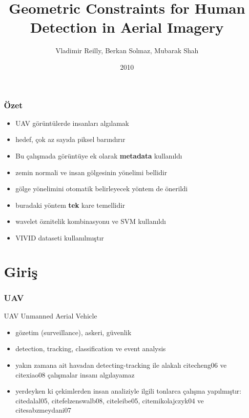 \documentclass{beamer}
\title{Geometric Constraints for Human Detection in Aerial Imagery}
\author{Vladimir Reilly, Berkan Solmaz, Mubarak Shah}
\date{2010}
\institute[CVL]{Computer Vision Lab, University of Central Florida, Orlando,
USA}
\begin{document}
\frame{\titlepage}

\section[İskelet]{}
\frame{\tableofcontents}

\begin{frame}
	\frametitle{Özet}

	\begin{itemize}
		\item UAV görüntülerde insanları algılamak
		\item hedef, çok az sayıda piksel barındırır
		\item Bu çalışmada görüntüye ek olarak \textbf{metadata} kullanıldı
		\item zemin normali ve insan gölgesinin yönelimi bellidir
		\item gölge yönelimini otomatik belirleyecek yöntem de önerildi
		\item buradaki yöntem \textbf{tek} kare temellidir
		\item wavelet öznitelik kombinasyonu ve SVM kullanıldı
		\item VIVID dataseti kullanılmıştır
	\end{itemize}
\end{frame}

\section{Giriş}

\begin{frame}
	\frametitle{UAV}

	\begin{block}{UAV}
		Unmanned Aerial Vehicle
	\end{block}

	\begin{itemize}
		\item gözetim (surveillance), askeri, güvenlik
		\item detection, tracking, classification ve event analysis
		\item yakın zamana ait havadan detecting-tracking ile alakalı
 		      cite{cheng06} ve cite{xiao08} çalışmalar insanı algılayamaz
		\item yerdeyken ki çekimlerden insan analiziyle ilgili tonlarca çalışma
		      yapılmıştır: cite{dalal05}, cite{felzenswalb08}, cite{leibe05},
			  cite{mikolajczyk04} ve cite{sabzmeydani07}
	\end{itemize}
\end{frame}
\end{document}
